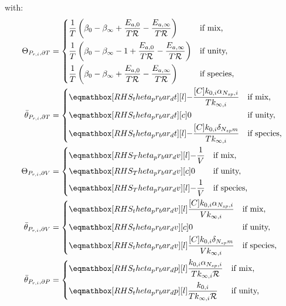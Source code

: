 \documentclass[12pt,number,sort&compress]{elsarticle}
\newcommand{\ns}{N_{sp}}
\newcommand{\Ru}{\mathcal{R}}
\begin{document}
with:
\begin{align}
 \label{e:dpr_theta_dt}
 \Theta_{P_{r,i}, \partial T} &=
 \begin{dcases}
  \frac{1}{T} \left(\beta_{0} - \beta_{\infty} + \frac{E_{a, 0}}{T \Ru} - \frac{E_{a, \infty}}{T \Ru}\right) & \text{if mix,} \\
  \frac{1}{T} \left(\beta_{0} - \beta_{\infty} - 1 + \frac{E_{a, 0}}{T \Ru} - \frac{E_{a, \infty}}{T \Ru}\right) & \text{if unity,} \\
  \frac{1}{T} \left(\beta_{0} - \beta_{\infty} + \frac{E_{a, 0}}{T \Ru} - \frac{E_{a, \infty}}{T \Ru}\right) & \text{if species,}
 \end{dcases} \\
 \label{e:dpr_theta_bar_dt}
 \bar{\theta}_{P_{r, i}, \partial T} &=
 \begin{dcases}
  \rhs{theta_pr_bar_dt}{- \frac{[C] k_{0, i} \alpha_{\ns,i}}{T k_{\infty, i}}} & \text{if mix,} \\
  \rhs{theta_pr_bar_dt}{0}[c] & \text{if unity,} \\
  \rhs{theta_pr_bar_dt}{- \frac{[C] k_{0, i} \delta_{\ns m}}{T k_{\infty, i}}} & \text{if species,}
 \end{dcases} \\
 \label{e:dpr_theta_dv}
 \Theta_{P_{r,i}, \partial V} &=
 \begin{dcases}
  \rhs{Theta_pr_bar_dv}{- \frac{1}{V}} & \text{if mix,} \\
  \rhs{Theta_pr_bar_dv}{0}[c] & \text{if unity,}  \\
  \rhs{Theta_pr_bar_dv}{- \frac{1}{V}} & \text{if species,}
 \end{dcases} \\
 \label{e:dpr_theta_bar_dv}
 \bar{\theta}_{P_{r, i}, \partial V} &=
 \begin{dcases}
  \rhs{theta_pr_bar_dv}{\frac{[C] k_{0, i} \alpha_{\ns,i}}{V k_{\infty, i}}} & \text{if mix,} \\
  \rhs{theta_pr_bar_dv}{0}[c] & \text{if unity,}  \\
  \rhs{theta_pr_bar_dv}{\frac{[C] k_{0, i} \delta_{\ns m}}{V k_{\infty, i}}} & \text{if species,}
 \end{dcases} \\
 \label{e:dpr_theta_dp}
 \bar{\theta}_{P_{r, i}, \partial P} &=
 \begin{dcases}
  \rhs{theta_pr_bar_dp}{\frac{k_{0, i} \alpha_{\ns,i}}{T k_{\infty, i} \Ru}} & \text{if mix,} \\
  \rhs{theta_pr_bar_dp}{\frac{k_{0, i}}{T k_{\infty, i} \Ru}} & \text{if unity,}  \\

\end{dcases}
\end{align}
\end{document}
